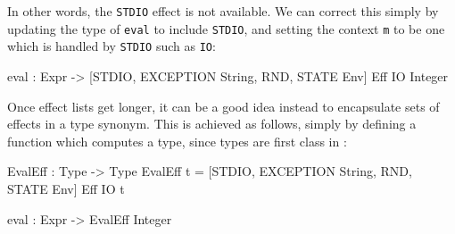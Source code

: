 \noindent
In other words, the \texttt{STDIO} effect is not available. We can correct
this simply by updating the type of \texttt{eval} to include \texttt{STDIO},
and setting the context \texttt{m} to be one which is handled by \texttt{STDIO}
such as \texttt{IO}:

\begin{code}
eval : Expr -> { [STDIO, EXCEPTION String, RND, STATE Env] } Eff IO Integer
\end{code}

\noindent
Once effect lists get longer, it can be a good idea instead
to encapsulate sets of effects in a type synonym. This is achieved as follows,
simply by defining a function which computes a type, since types are first
class in \Idris{}:

\begin{code}
EvalEff : Type -> Type
EvalEff t = { [STDIO, EXCEPTION String, RND, STATE Env] } Eff IO t
  
eval : Expr -> EvalEff Integer
\end{code}


